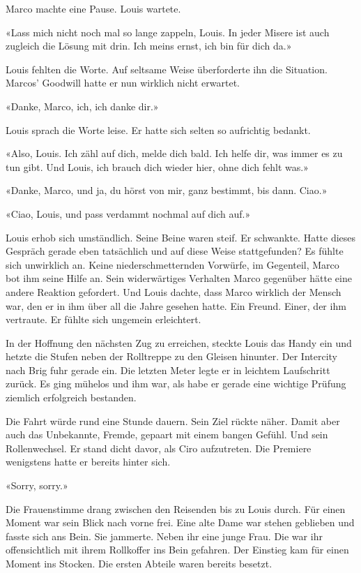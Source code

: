 Marco machte eine Pause. Louis wartete.

«Lass mich nicht noch mal so lange zappeln, Louis. In jeder Misere ist
auch zugleich die Lösung mit drin. Ich meins ernst, ich bin für dich
da.»

Louis fehlten die Worte. Auf seltsame Weise überforderte ihn die
Situation. Marcos’ Goodwill hatte er nun wirklich nicht erwartet.

«Danke, Marco, ich, ich danke dir.»

Louis sprach die Worte leise. Er hatte sich selten so aufrichtig
bedankt.

«Also, Louis. Ich zähl auf dich, melde dich bald. Ich helfe dir, was
immer es zu tun gibt. Und Louis, ich brauch dich wieder hier, ohne dich
fehlt was.»

«Danke, Marco, und ja, du hörst von mir, ganz bestimmt, bis dann. Ciao.»

«Ciao, Louis, und pass verdammt nochmal auf dich auf.»

\sectionbreak

Louis erhob sich umständlich. Seine Beine waren steif. Er schwankte.
Hatte dieses Gespräch gerade eben tatsächlich und auf diese Weise
stattgefunden? Es fühlte sich unwirklich an. Keine niederschmetternden
Vorwürfe, im Gegenteil, Marco bot ihm seine Hilfe an. Sein widerwärtiges
Verhalten Marco gegenüber hätte eine andere Reaktion gefordert. Und
Louis dachte, dass Marco wirklich der Mensch war, den er in ihm über all
die Jahre gesehen hatte. Ein Freund. Einer, der ihm vertraute. Er fühlte
sich ungemein erleichtert.

In der Hoffnung den nächsten Zug zu erreichen, steckte Louis das Handy
ein und hetzte die Stufen neben der Rolltreppe zu den Gleisen
hinunter.
Der Intercity nach Brig fuhr gerade ein. Die letzten Meter legte er 
in leichtem Laufschritt zurück. Es ging mühelos und ihm war, als habe er
gerade eine wichtige Prüfung ziemlich erfolgreich bestanden.

Die Fahrt würde rund eine Stunde dauern. Sein Ziel rückte näher. Damit
aber auch das Unbekannte, Fremde, gepaart mit einem bangen Gefühl. Und
sein Rollenwechsel. Er stand dicht davor, als Ciro aufzutreten. Die
Premiere wenigstens hatte er bereits hinter sich.

\sectionbreak

«Sorry, sorry.»

Die Frauenstimme drang zwischen den Reisenden bis zu Louis durch. Für
einen Moment war sein Blick nach vorne frei. Eine alte Dame war stehen
geblieben und fasste sich ans Bein. Sie jammerte. Neben ihr eine junge
Frau. Die war ihr offensichtlich mit ihrem Rollkoffer ins Bein gefahren.
Der Einstieg kam für einen Moment ins Stocken. Die ersten Abteile waren
bereits besetzt.

